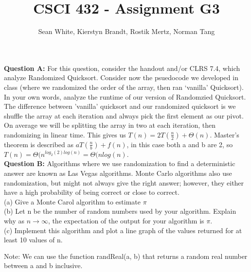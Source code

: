 \documentclass[12pt]{article}
\author{Sean White, Kierstyn Brandt, Rostik Mertz, Norman Tang}
\title{CSCI 432 - Assignment G3}
\begin{document}
\maketitle

\noindent
\textbf{Question A:} For this question, consider the handout and/or CLRS 7.4, which analyze Randomized Quicksort. Consider now the psuedocode we developed in class (where we randomized the order of the array, then ran ‘vanilla’ Quicksort). In your own words, analyze the runtime of our version of Randomzied Quicksort.\\

The difference between 'vanilla' quicksort and our randomized quicksort is we shuffle the array at each iteration and always pick the first element as our pivot. On average we will be splitting the array in two at each iteration, then randomizing in linear time. This gives us $T(n) = 2T(\frac{n}{2}) + \Theta(n)$. Master's theorem is described as $aT(\frac{n}{b}) +f(n)$, in this case both a and b are 2, so $T(n) = \Theta(n^{log_2 (2)log(n)} = \Theta(n log(n)$.\\ 

\noindent
\textbf{Question B:} Algorithms where we use randomization to find a deterministic answer are known as Las Vegas algorithms. Monte Carlo algorithms also use randomization, but might not always give the right answer; however, they either have a high probability of being correct or close to correct.\\

\noindent
(a) Give a Monte Carol algorithm to estimate $\pi$\\

\noindent
(b) Let n be the number of random numbers used by your algorithm. Explain why as $n \rightarrow \infty$, the expectation of the output for your algorithm is $\pi$.\\

\noindent
(c) Implement this algorithm and plot a line graph of the values returned for at least 10 values of n.

\noindent
Note: We can use the function randReal(a, b) that returns a random real number between a and b inclusive.\\
\end{document}
